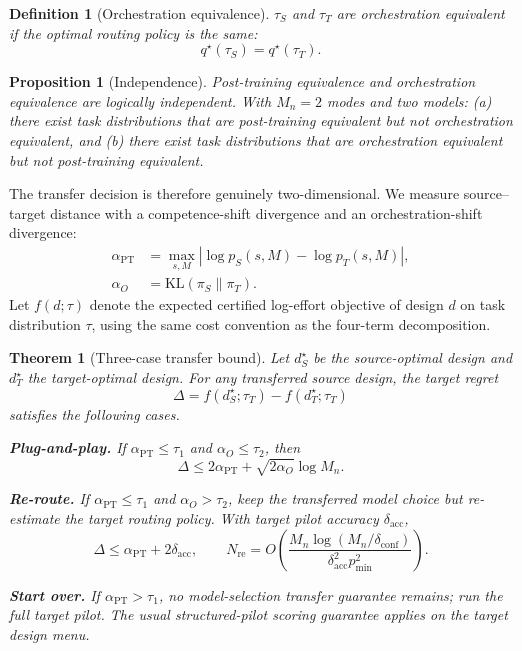 \documentclass[twoside,11pt]{article}
\newtheorem{theorem}{Theorem}
\newtheorem{proposition}{Proposition}
\newtheorem{definition}{Definition}
\newcommand{\KL}{\mathrm{KL}}
\newcommand{\Mn}{M_n}
\newcommand{\pmin}{p_{\min}}
\newcommand{\dacc}{\delta_{\mathrm{acc}}}
\newcommand{\dconf}{\delta_{\mathrm{conf}}}
\begin{document}
\begin{definition}[Orchestration equivalence]
\label{def:orch-equiv}
\(\tau_S\) and \(\tau_T\) are \emph{orchestration equivalent} if the optimal routing policy is the same:
\[
  q^\star(\tau_S)=q^\star(\tau_T).
\]
\end{definition}

\begin{proposition}[Independence]
\label{prop:transfer-independence}
Post-training equivalence and orchestration equivalence are logically independent.
With \(\Mn=2\) modes and two models:
(a) there exist task distributions that are post-training equivalent but not orchestration equivalent, and
(b) there exist task distributions that are orchestration equivalent but not post-training equivalent.
\end{proposition}

The transfer decision is therefore genuinely two-dimensional.
We measure source--target distance with a competence-shift divergence and an orchestration-shift divergence:
\begin{align}
  \alpha_{\mathrm{PT}}
  &=
  \max_{s,M}
  \left|
  \log p_S(s,M)-\log p_T(s,M)
  \right|,
  \label{eq:alpha-pt}
  \\
  \alpha_O
  &=
  \KL(\pi_S\|\pi_T).
  \label{eq:alpha-o}
\end{align}
Let \(f(d;\tau)\) denote the expected certified log-effort objective of design \(d\) on task distribution \(\tau\), using the same cost convention as the four-term decomposition.

\begin{theorem}[Three-case transfer bound]
\label{thm:transfer}
Let \(d_S^\star\) be the source-optimal design and \(d_T^\star\) the target-optimal design.
For any transferred source design, the target regret
\[
  \Delta
  =
  f(d_S^\star;\tau_T)-f(d_T^\star;\tau_T)
\]
satisfies the following cases.

\noindent\textbf{Plug-and-play.}
If \(\alpha_{\mathrm{PT}}\le\tau_1\) and \(\alpha_O\le\tau_2\), then
\[
  \Delta
  \le
  2\alpha_{\mathrm{PT}}
  +
  \sqrt{2\alpha_O}\log\Mn .
\]

\noindent\textbf{Re-route.}
If \(\alpha_{\mathrm{PT}}\le\tau_1\) and \(\alpha_O>\tau_2\), keep the transferred model choice but re-estimate the target routing policy.
With target pilot accuracy \(\dacc\),
\[
  \Delta\le\alpha_{\mathrm{PT}}+2\dacc,
  \qquad
  N_{\mathrm{re}}
  =
  O\!\left(
  \frac{\Mn\log(\Mn/\dconf)}
  {\dacc^2\pmin^2}
  \right).
\]

\noindent\textbf{Start over.}
If \(\alpha_{\mathrm{PT}}>\tau_1\), no model-selection transfer guarantee remains; run the full target pilot.
The usual structured-pilot scoring guarantee applies on the target design menu.
\end{theorem}
\end{document}
